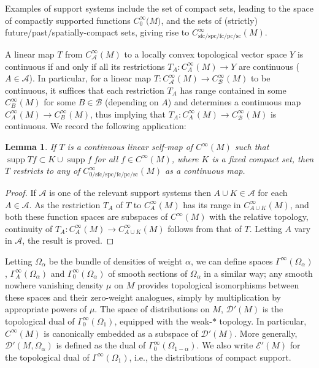\documentclass[11pt]{article}
\numberwithin{equation}{section}
\numberwithin{equation}{section}
\newtheorem{Lemma}[Theorem]{Lemma}
\newcommand{\CoinX}[1]{C_0^\infty\big({#1}\big)}
\newcommand{\GoinX}[1]{\Gamma_0^\infty({#1})}
\newcommand{\fc}{\mathrm{fc}}
\newcommand{\pc}{\mathrm{pc}}
\newcommand{\sfc}{\mathrm{sfc}}
\newcommand{\spc}{\mathrm{spc}}
\newcommand{\DD}{{\mathscr D}}
\newcommand{\EE}{{\mathscr E}}
\DeclareMathOperator{\supp}{supp}
\begin{document}
 Examples of support systems include the set of compact sets, leading to the space of compactly supported functions $\CoinX{M}$, and the sets of (strictly) future/past/spatially-compact sets, giving rise to $C^\infty_{\sfc/\spc/\fc/\pc/\mathrm{sc}}(M)$.

 A linear map $T$ from $C^\infty_{\mathscr{A}}(M)$ to a locally convex topological vector space $Y$ is continuous if and only if all its restrictions $T_A\colon C^\infty_A(M)\to Y$ are continuous ($A\in\mathscr{A}$). In particular, for a linear map $T\colon C^\infty_{\mathscr{A}}(M)\to C^\infty_{\mathscr{B}}(M)$ to be continuous, it suffices that each restriction $T_A$ has range contained in some $C^\infty_B(M)$ for some $B\in\mathscr{B}$ (depending on $A$) and determines a continuous map $C^\infty_A(M)\to C^\infty_B(M)$, thus implying that $T_A\colon C^\infty_A(M)\to C^\infty_{\mathscr{B}}(M)$ is continuous. We record the following application:
 \begin{Lemma}%
 	If $T$ is a continuous linear self-map of $C^\infty(M)$ such that $\supp Tf\subset K\cup \supp f$ for all $f\in C^\infty(M)$, where $K$ is a fixed compact set, then $T$ restricts to any of $C^\infty_{0/\sfc/\spc/\fc/\pc/\mathrm{sc}}(M)$ as a continuous map.
 \end{Lemma}
 \begin{proof}
 	If $\mathscr{A}$ is one of the relevant support systems then $A\cup K\in\mathscr{A}$ for each $A\in\mathscr{A}$. As the restriction $T_A$ of $T$ to $C^\infty_A(M)$ has its range in $C^\infty_{A\cup K}(M)$, and both these function spaces are subspaces of $C^\infty(M)$ with the relative topology, continuity of $T_A\colon C^\infty_A(M)\to C^\infty_{A\cup K}(M)$ follows from that of $T$. Letting $A$ vary in $\mathscr{A}$, the result is proved.
 \end{proof}

 Letting $\Omega_\alpha$ be the bundle of densities of weight $\alpha$, we can define spaces $\Gamma^\infty(\Omega_\alpha)$,
 $\Gamma_A^\infty(\Omega_\alpha)$ and $\GoinX{\Omega_\alpha}$ of smooth sections
 of $\Omega_\alpha$ in a similar way; any smooth nowhere vanishing density $\mu$ on
 $M$ provides topological isomorphisms between these spaces and their zero-weight analogues, simply by multiplication by appropriate powers of $\mu$. The space of distributions on $M$, $\DD'(M)$ is the topological dual of $\GoinX{\Omega_1}$,
 equipped with the weak-$*$ topology. In particular, $C^\infty(M)$ is canonically embedded as a subspace of $\DD'(M)$. More generally,
 $\DD'(M,\Omega_\alpha)$ is defined as the dual of $\GoinX{\Omega_{1-\alpha}}$.
 We also write $\EE'(M)$ for the topological dual of $\Gamma^\infty(\Omega_1)$, i.e.,
 the distributions of compact support.
\end{document}

